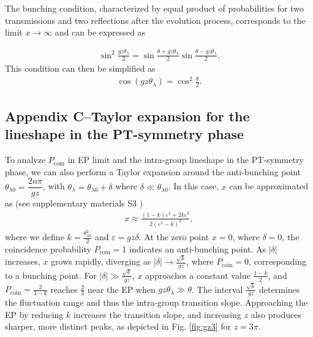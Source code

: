 \documentclass[%
reprint,
superscriptaddress,
amsthm,amsmath,amssymb,
aps,
]{revtex4-1}
\begin{document}
The bunching condition, characterized by equal product of probabilities for two transmissions and two reflections after the evolution process, corresponds to the limit $x\rightarrow\infty$ and can be expressed as

\begin{eqnarray}
	\sin^{2} \frac{gz\theta_{\lambda }}{2}=\sin \frac{\theta+gz\theta_{\lambda}}{2}\sin \frac{\theta-gz\theta_{\lambda}}{2}.
\end{eqnarray}
This condition can then be simplified as
\begin{eqnarray}
	\cos(gz \theta_{\lambda})=\cos^{2} \frac{\theta}{2}.
\end{eqnarray}



\subsection*{\label{sec:leveled3}Appendix C--Taylor expansion for the lineshape in the PT-symmetry phase }

To analyze $P_{\text{coin}}$ in EP limit and the intra-group lineshape in the PT-symmetry phase, we can also perform a Taylor expansion around the anti-bunching point $\theta_{\lambda 0}=\dfrac{2n\pi}{gz} $, with $\theta_{\lambda}=\theta_{\lambda 0}+\delta $ where $\delta\ll \theta_{\lambda 0}$. In this case, $x$ can be approximated as (see supplementary materials S3 \cite{SupplementalMaterial})
\begin{eqnarray}
	x\approx\frac{\left( 1 - k \right) \varepsilon^4 +2k\varepsilon^{2}}{2 \left( \varepsilon^{2}-k \right)^2}\label{14},
\end{eqnarray}
where we define $k= \frac{\theta_{\lambda 0}^{2}}{2}$ and $\varepsilon=g z \delta$. At the zero point $x=0$, where $\delta=0$, the coincidence probability $P_{\text{coin}}=1$ indicates an anti-bunching point. As $|\delta|$ increases, $x$ grows rapidly, diverging as $|\delta|\rightarrow\frac{\sqrt{k}}{gz}$, where $P_{\text{coin}}=0$, corresponding to a bunching point. For $|\delta|\gg\frac{\sqrt{k}}{gz}$, $x$ approaches a constant value $\frac{1-k}{2}$, and $P_{\text{coin}}=\frac{2}{3-k}$ reaches $\frac{2}{3}$ near the EP when $gz\theta_{\lambda}\gg\theta$. The interval $\frac{\sqrt{k}}{gz}$ determines the fluctuation range and thus the intra-group transition slope. Approaching the EP by reducing $k$ increases the transition slope, and increasing $z$ also produces sharper, more distinct peaks, as depicted in Fig. \ref{fig:gz3} for $z=3\pi$.
\end{document}
